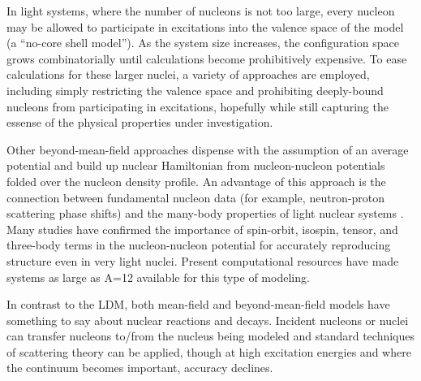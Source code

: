 In light systems, where the number of nucleons is not too large, every nucleon
may be allowed to participate in excitations into the valence space of the model
(a ``no-core shell model''). As the system size increases, the configuration space grows
combinatorially until calculations become prohibitively expensive. To ease calculations for these 
larger nuclei, a variety of approaches
are employed, including simply restricting the valence space and prohibiting deeply-bound 
nucleons from participating in excitations, hopefully while still capturing the
essense of the physical properties under investigation.


Other beyond-mean-field approaches dispense with the assumption of an average
potential and build up nuclear Hamiltonian from nucleon-nucleon potentials
folded over the nucleon density profile. An advantage
of this approach is the connection between fundamental nucleon data
(for example, neutron-proton scattering phase shifts) and the many-body
properties of light nuclear systems \cite{AV18}. Many studies have
confirmed the importance of spin-orbit, isospin, tensor, and three-body terms
in the nucleon-nucleon potential for accurately reproducing structure even in
very light nuclei. Present computational resources have made systems as large as A=12 available for
this type of modeling.


In contrast to the LDM, both mean-field and beyond-mean-field models have
something to say about nuclear reactions and decays. Incident nucleons or nuclei can
transfer nucleons to/from the nucleus being modeled and standard
techniques of scattering theory can be applied, though at high excitation
energies and where the continuum becomes important, accuracy declines.

